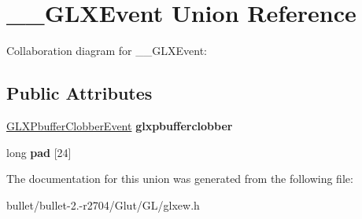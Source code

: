 \hypertarget{union_____g_l_x_event}{\section{\+\_\+\+\_\+\+G\+L\+X\+Event Union Reference}
\label{union_____g_l_x_event}
}


Collaboration diagram for \+\_\+\+\_\+\+G\+L\+X\+Event\+:
\subsection*{Public Attributes}
\begin{DoxyCompactItemize}
\item 
\hypertarget{union_____g_l_x_event_ada5880e2b424bcb2f60a411aaf713fae}{\hyperlink{struct_g_l_x_pbuffer_clobber_event}{G\+L\+X\+Pbuffer\+Clobber\+Event} {\bfseries glxpbufferclobber}}\label{union_____g_l_x_event_ada5880e2b424bcb2f60a411aaf713fae}

\item 
\hypertarget{union_____g_l_x_event_a1cb8f6e7e77a34d25baf43b3f3bc2d4f}{long {\bfseries pad} \mbox{[}24\mbox{]}}\label{union_____g_l_x_event_a1cb8f6e7e77a34d25baf43b3f3bc2d4f}

\end{DoxyCompactItemize}


The documentation for this union was generated from the following file\+:\begin{DoxyCompactItemize}
\item 
bullet/bullet-\/2.-\/r2704/\+Glut/\+G\+L/glxew.\+h\end{DoxyCompactItemize}

